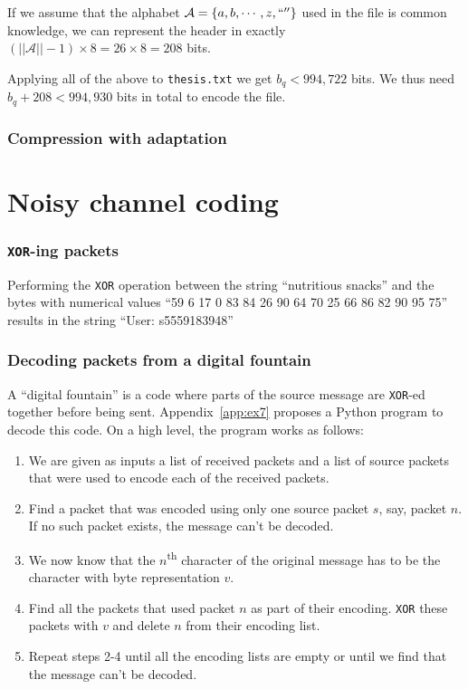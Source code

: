 \documentclass[10pt,a4paper,oneside,onecolumn]{article}
\newcommand*{\thesisTXT}{{\tt thesis.txt}\xspace}
\newcommand*{\XOR}{{\tt XOR}\xspace}
\newcommand*{\norm}[1]{\ensuremath{\left|\left|#1\right|\right|}}
\newcommand*{\lbr}{\ensuremath{\left\{}}
\newcommand*{\rbr}{\ensuremath{\right\}}}
\begin{document}
If we assume that the alphabet $\mathcal{A} = \lbr a, b, \cdots, z, `` '' \rbr$
used in the file is common knowledge, we can represent the header in exactly
$(\norm{\mathcal{A}} - 1) \times 8 = 26 \times 8 = 208$ bits\footnotemark.

Applying all of the above to \thesisTXT we get $b_q < 994,722$ bits. We thus
need $b_q + 208 < 994,930$ bits in total to encode the file.


\section{Compression with adaptation}\label{sec:ex5}


\part{Noisy channel coding}

\section{\XOR-ing packets}\label{sec:ex6}

Performing the \XOR operation between the string ``nutritious snacks'' and the
bytes with numerical values ``59 6 17 0 83 84 26 90 64 70 25 66 86 82 90 95 75''
results in the string ``User: s5559183948''

\section{Decoding packets from a digital fountain}\label{sec:ex7}

A ``digital fountain'' is a code where parts of the source message are \XOR-ed
together before being sent. Appendix~\ref{app:ex7} proposes a Python program to
decode this code. On a high level, the program works as follows:

\begin{enumerate}
\item We are given as inputs a list of received packets and a list of source
      packets that were used to encode each of the received packets.
\item Find a packet that was encoded using only one source packet $s$, say,
      packet $n$.  If no such packet exists, the message can't be decoded.
\item We now know that the $n$\textsuperscript{th} character of the original
      message has to be the character with byte representation $v$.
\item Find all the packets that used packet $n$ as part of their encoding.
      \XOR these packets with $v$ and delete $n$ from their encoding list.
\item Repeat steps 2-4 until all the encoding lists are empty or until we find
      that the message can't be decoded.
\end{enumerate}
\end{document}
